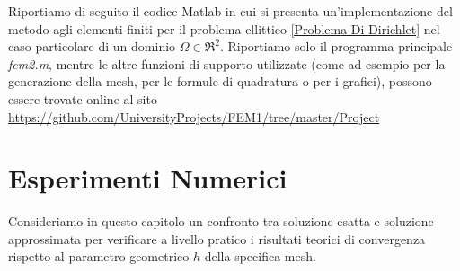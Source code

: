 \documentclass[12pt,a4paper]{report}
\theoremstyle{theorem}
\theoremstyle{definition}
\begin{document}
Riportiamo di seguito il codice Matlab in cui si presenta un'implementazione del metodo agli elementi finiti per il problema ellittico \ref{Problema Di Dirichlet} nel caso particolare di un dominio $\Omega \in \Re^{2}$. Riportiamo solo il programma principale \emph{fem2.m}, mentre le altre funzioni di supporto utilizzate (come ad esempio per la generazione della mesh, per le formule di quadratura o per i grafici), possono essere trovate online al sito \url{https://github.com/UniversityProjects/FEM1/tree/master/Project}
%



\chapter{Esperimenti Numerici}
Consideriamo in questo capitolo un confronto tra soluzione esatta e soluzione approssimata per verificare a livello pratico i risultati teorici di convergenza rispetto al parametro geometrico $h$ della specifica mesh.


\printindex

% 

%

\end{document}
